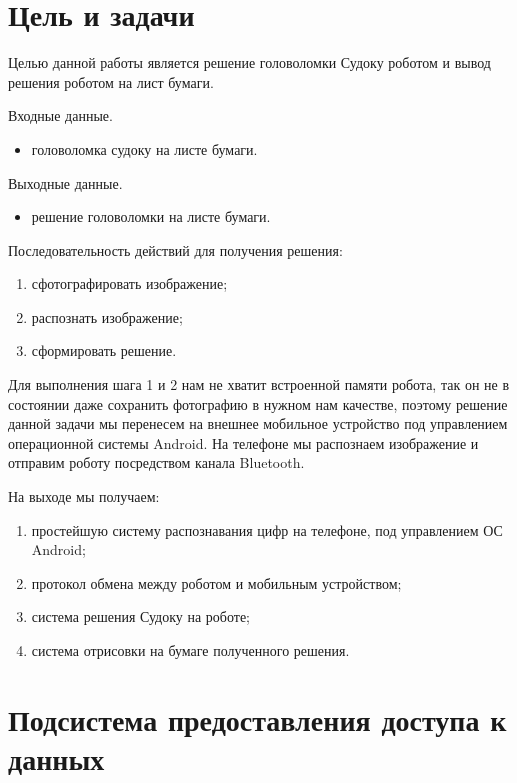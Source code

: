 \section{Цель и задачи}
Целью данной работы является решение головоломки Судоку роботом и вывод решения роботом на лист бумаги.


Входные данные.
\begin{itemize}
\item головоломка судоку на листе бумаги.
\end{itemize}

Выходные данные.
\begin{itemize}
\item решение головоломки на листе бумаги.
\end{itemize}

Последовательность действий для  получения решения:
\begin{enumerate}
\item сфотографировать изображение;
\item распознать изображение;
\item сформировать решение.
\end{enumerate}
Для выполнения шага 1 и 2 нам не хватит встроенной памяти робота, так он не в состоянии даже сохранить фотографию в нужном нам качестве, поэтому решение данной задачи мы перенесем на внешнее мобильное устройство под управлением операционной системы Android. На телефоне мы распознаем изображение и отправим роботу посредством канала Bluetooth.

На выходе мы получаем:
\begin{enumerate}
\item простейшую систему распознавания цифр на телефоне, под управлением ОС Android;
\item протокол обмена между роботом и мобильным устройством;
\item система решения Судоку на роботе;
\item система отрисовки на бумаге полученного решения.
\end{enumerate}


\section{Подсистема предоставления доступа к данных}

